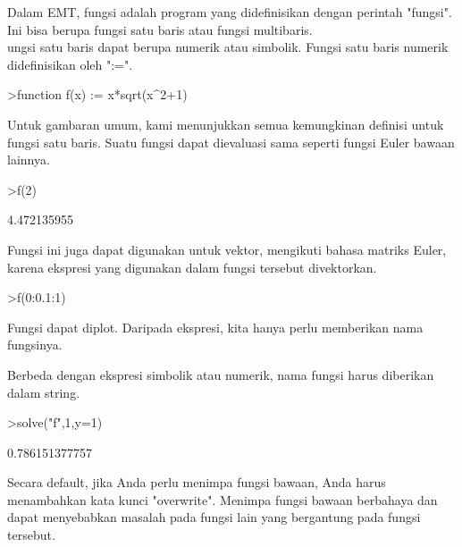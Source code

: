 \begin{eulernotebook}
\begin{eulercomment}
\begin{eulercomment}
\begin{eulerformula}
\end{eulerformula}
\begin{eulercomment}
Dalam EMT, fungsi adalah program yang didefinisikan dengan perintah
"fungsi". Ini bisa berupa fungsi satu baris atau fungsi multibaris.\\
ungsi satu baris dapat berupa numerik atau simbolik. Fungsi satu baris
numerik didefinisikan oleh ":=".
\end{eulercomment}
\begin{eulerprompt}
>function f(x) := x*sqrt(x^2+1)
\end{eulerprompt}
\begin{eulercomment}
Untuk gambaran umum, kami menunjukkan semua kemungkinan definisi untuk
fungsi satu baris. Suatu fungsi dapat dievaluasi sama seperti fungsi
Euler bawaan lainnya.
\end{eulercomment}
\begin{eulerprompt}
>f(2)
\end{eulerprompt}
\begin{euleroutput}
  4.472135955
\end{euleroutput}
\begin{eulercomment}
Fungsi ini juga dapat digunakan untuk vektor, mengikuti bahasa matriks
Euler, karena ekspresi yang digunakan dalam fungsi tersebut
divektorkan.
\end{eulercomment}
\begin{eulerprompt}
>f(0:0.1:1)
\end{eulerprompt}
\begin{euleroutput}
  [0,  0.100499,  0.203961,  0.313209,  0.430813,  0.559017,  0.699714,
  0.854459,  1.0245,  1.21083,  1.41421]
\end{euleroutput}
\begin{eulercomment}
Fungsi dapat diplot. Daripada ekspresi, kita hanya perlu memberikan
nama fungsinya.

Berbeda dengan ekspresi simbolik atau numerik, nama fungsi harus
diberikan dalam string.
\end{eulercomment}
\begin{eulerprompt}
>solve("f",1,y=1)
\end{eulerprompt}
\begin{euleroutput}
  0.786151377757
\end{euleroutput}
\begin{eulercomment}
Secara default, jika Anda perlu menimpa fungsi bawaan, Anda harus
menambahkan kata kunci "overwrite". Menimpa fungsi bawaan berbahaya
dan dapat menyebabkan masalah pada fungsi lain yang bergantung pada
fungsi tersebut.



\end{eulercomment}
\end{eulercomment}
\end{eulercomment}
\end{eulernotebook}
